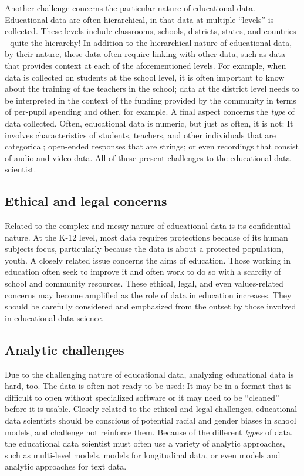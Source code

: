 \documentclass[]{book}
\begin{document}
Another challenge concerns the particular nature of educational data.
Educational data are often hierarchical, in that data at multiple
``levels'' is collected. These levels include classrooms, schools,
districts, states, and countries - quite the hierarchy! In addition to
the hierarchical nature of educational data, by their nature, these data
often require linking with other data, such as data that provides
context at each of the aforementioned levels. For example, when data is
collected on students at the school level, it is often important to know
about the training of the teachers in the school; data at the district
level needs to be interpreted in the context of the funding provided by
the community in terms of per-pupil spending and other, for example. A
final aspect concerns the \emph{type} of data collected. Often,
educational data is numeric, but just as often, it is not: It involves
characteristics of students, teachers, and other individuals that are
categorical; open-ended responses that are strings; or even recordings
that consist of audio and video data. All of these present challenges to
the educational data scientist.

\subsection{Ethical and legal
concerns}\label{ethical-and-legal-concerns}

Related to the complex and messy nature of educational data is its
confidential nature. At the K-12 level, most data requires protections
because of its human subjects focus, particularly because the data is
about a protected population, youth. A closely related issue concerns
the aims of education. Those working in education often seek to improve
it and often work to do so with a scarcity of school and community
resources. These ethical, legal, and even values-related concerns may
become amplified as the role of data in education increases. They should
be carefully considered and emphasized from the outset by those involved
in educational data science.

\subsection{Analytic challenges}\label{analytic-challenges}

Due to the challenging nature of educational data, analyzing educational
data is hard, too. The data is often not ready to be used: It may be in
a format that is difficult to open without specialized software or it
may need to be ``cleaned'' before it is usable. Closely related to the
ethical and legal challenges, educational data scientists should be
conscious of potential racial and gender biases in school models, and
challenge not reinforce them. Because of the different \emph{types} of
data, the educational data scientist must often use a variety of
analytic approaches, such as multi-level models, models for longitudinal
data, or even models and analytic approaches for text data.
\end{document}
